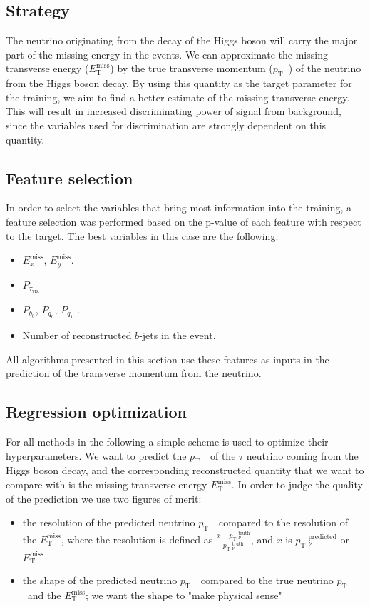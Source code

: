 \documentclass{scrartcl}
\newcommand{\etmiss}{$E_\mathrm{T}^\text{miss}$}
\newcommand{\exmiss}{$E_x^\text{miss}$}
\newcommand{\eymiss}{$E_y^\text{miss}$}
\newcommand{\pt}{\ensuremath{p_\text{T}}~}
\begin{document}
\subsection{Strategy}
The neutrino originating from the decay of the Higgs boson will carry the major part of the missing energy in the events. We can approximate the missing transverse energy (\etmiss) by the true transverse momentum (\pt) of the neutrino from the Higgs boson decay. By using this quantity as the target parameter for the training, we aim to find a better estimate of the missing transverse energy. This will result in increased discriminating power of signal from background, since the variables used for discrimination are strongly dependent on this quantity.

\subsection{Feature selection}
In order to select the variables that bring most information into the training, a feature selection was performed based on the p-value of each feature with respect to the target. The best variables in this case are the following:

\begin{itemize}
    \item \exmiss, \eymiss.
    \item $P_{\tau_\mathrm{vis.}}$ 
     \item $P_{b_0}$, $P_{q_0}$, $P_{q_1}$ .
     \item Number of reconstructed $b$-jets in the event.
\end{itemize}

All algorithms presented in this section use these features as inputs in the prediction of the transverse momentum from the neutrino.

\subsection{Regression optimization}
\label{sec:optimization}
For all methods in the following a simple scheme is used to optimize their hyperparameters. We want to predict the \pt\ of the $τ$ neutrino coming from the Higgs boson decay, and the corresponding reconstructed quantity that we want to compare with is the missing transverse energy \etmiss. In order to judge the quality of the prediction we use two figures of merit:
\begin{itemize}
  \item the resolution of the predicted neutrino \pt\ compared to the resolution of the \etmiss, where the resolution is defined as $\frac{x-\pt_ν^{\text{truth}}}{\pt_ν^{\text{truth}}}$, and $x$ is $\pt_ν^{\text{predicted}}$ or \etmiss
  \item the shape of the predicted neutrino \pt\ compared to the true neutrino \pt and the \etmiss; we want the shape to "make physical sense"
\end{itemize}
\end{document}
